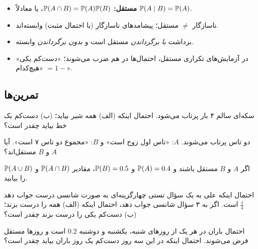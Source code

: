 \begin{summary}[title={\leavevmode\boxicon{accent}{$\Sigma$}\ \ خلاصهٔ فصل}]
\begin{itemize}
  \item \textbf{مستقل:} $\P(A\cap B)=\P(A)\P(B)$، یا معادلاً $\P(A\mid B)=\P(A)$.
  \item ناسازگار $\ne$ مستقل؛ پیشامدهای ناسازگار (با احتمال مثبت) وابسته‌اند.
  \item برداشت \emph{با برگرداندن} مستقل است و \emph{بدون برگرداندن} وابسته.
  \item در آزمایش‌های تکراری مستقل، احتمال‌ها در هم ضرب می‌شوند؛ «دست‌کم یکی» $=1-$ «هیچ‌کدام».
\end{itemize}
\end{summary}

\subsection*{تمرین‌ها}

\begin{exercise}
سکه‌ای سالم ۴ بار پرتاب می‌شود. احتمال اینکه (الف) همه شیر بیاید؛ (ب) دست‌کم یک خط بیاید چقدر است؟
\end{exercise}

\begin{exercise}
دو تاس پرتاب می‌شوند. $A$: «تاس اول زوج است» و $B$: «مجموع دو تاس ۷ است». آیا $A$ و $B$ مستقل‌اند؟
\end{exercise}

\begin{exercise}
اگر $A$ و $B$ مستقل باشند و $\P(A)=0.4$ و $\P(B)=0.5$، مقادیر $\P(A\cap B)$ و $\P(A\cup B)$ را بیابید.
\end{exercise}

\begin{exercise}
احتمال اینکه علی به یک سؤال تستی چهارگزینه‌ای به صورت شانسی درست جواب دهد $\tfrac14$ است. اگر به ۳ سؤال شانسی جواب دهد، احتمال اینکه (الف) همه را درست بزند؛ (ب) دست‌کم یکی را درست بزند چقدر است؟
\end{exercise}

\begin{exercise}
احتمال باران در هر یک از روزهای شنبه، یکشنبه و دوشنبه $0.2$ است و روزها مستقل فرض می‌شوند. احتمال اینکه در این سه روز دست‌کم یک روز باران بیاید چقدر است؟
\end{exercise}
